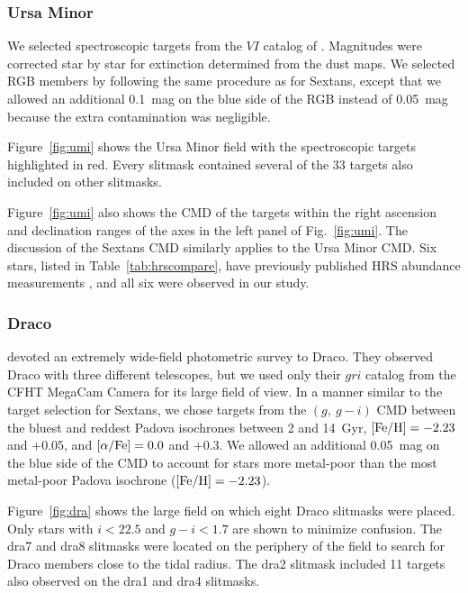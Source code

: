 \documentclass{emulateapj}
\begin{document}
\subsubsection{Ursa Minor}

We selected spectroscopic targets from the $VI$ catalog of
\citet{bel02}.  Magnitudes were corrected star by star for extinction
determined from the \citet{sch98} dust maps.  We selected RGB members
by following the same procedure as for Sextans, except that we allowed
an additional 0.1~mag on the blue side of the RGB instead of 0.05~mag
because the extra contamination was negligible.

Figure~\ref{fig:umi} shows the Ursa Minor field with the spectroscopic
targets highlighted in red.  Every slitmask contained several of the
33 targets also included on other slitmasks.

Figure~\ref{fig:umi} also shows the CMD of the targets within the
right ascension and declination ranges of the axes in the left panel
of Fig.~\ref{fig:umi}.  The discussion of the Sextans CMD similarly
applies to the Ursa Minor CMD\@.  Six stars, listed in
Table~\ref{tab:hrscompare}, have previously published HRS abundance
measurements \citep{she01a,sad04}, and all six were observed in our
study.


\subsubsection{Draco}
\label{sec:dra}

\citet{seg07} devoted an extremely wide-field photometric survey to
Draco.  They observed Draco with three different telescopes, but we
used only their $gri$ catalog from the CFHT MegaCam Camera for its
large field of view.  In a manner similar to the target selection for
Sextans, we chose targets from the $(g,\ g-i)$ CMD between the bluest
and reddest Padova isochrones \citep{gir02} between 2 and 14~Gyr,
${\rm [Fe/H]} = -2.23$ and $+0.05$, and ${\rm [\alpha/Fe]} = 0.0$ and $+0.3$.  We
allowed an additional 0.05~mag on the blue side of the CMD to account
for stars more metal-poor than the most metal-poor Padova isochrone
(${\rm [Fe/H]} = -2.23$).

Figure~\ref{fig:dra} shows the large field on which eight Draco
slitmasks were placed.  Only stars with $i < 22.5$ and $g-i < 1.7$ are
shown to minimize confusion.  The dra7 and dra8 slitmasks were located
on the periphery of the field to search for Draco members close to the
tidal radius.  The dra2 slitmask included 11 targets also observed on
the dra1 and dra4 slitmasks.
\end{document}
